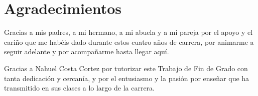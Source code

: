 \chapter*{Agradecimientos}

Gracias a mis padres, a mi hermano, a mi abuela y a mi pareja por el apoyo y el cariño que me habéis dado durante estos cuatro años de carrera, por animarme a seguir adelante y por acompañarme hasta llegar aquí.

Gracias a Nahuel Costa Cortez por tutorizar este Trabajo de Fin de Grado con tanta dedicación y cercanía, y por el entusiasmo y la pasión por enseñar que ha transmitido en sus clases a lo largo de la carrera.
